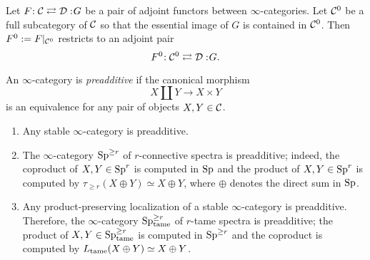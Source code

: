 
\begin{proposition}
\label{Restrict adjoints to full subcategory}
	Let $F\negmedspace: {\mathcal{C}}\rightleftarrows {\mathcal{D}}:\negmedspace G$ be a pair of adjoint functors between $\infty$-categories.
	Let ${\mathcal{C}}^0$ be a full subcategory of ${\mathcal{C}}$ so that the essential image of $G$ is contained in ${\mathcal{C}}^0$. Then $F^0:=F|_{{\mathcal{C}}^0}$ restricts to an adjoint pair 
	$$
	F^0\negmedspace: {\mathcal{C}}^0\rightleftarrows {\mathcal{D}}:\negmedspace G.
	$$
\end{proposition}

\begin{definition}
\cite[Definition 2.1]{Gepner-Moritz-Nikolaus}
\label{preadditive}
    An $\infty$-category is \emph{preadditive} if the canonical morphism 
    $$
    X\coprod Y \to X\times Y
    $$
    is an equivalence for any pair of objects $X,Y \in {\mathcal{C}}$.
\end{definition}

\begin{example}
\begin{enumerate}
    \item Any stable $\infty$-category is preadditive.
    \item The $\infty$-category $\operatorname{Sp}^{\geq r}$ of $r$-connective spectra is preadditive;
    indeed, the coproduct of $X,Y\in \operatorname{Sp}^{r}$ is computed in $\operatorname{Sp}$ and the product of $X,Y\in \operatorname{Sp}^{r}$ is computed by $\tau_{\geq r} (X\oplus Y)\simeq X\oplus Y$, where $\oplus$ denotes the direct sum in $\operatorname{Sp}$.
    \item Any product-preserving localization of a stable $\infty$-category is preadditive.
    Therefore, 
    the $\infty$-category $\operatorname{Sp}^{\geq r}_{\operatorname{\operatorname{tame}}}$ of $r$-tame spectra is preadditive; the product of $X,Y\in \operatorname{Sp}^{\geq r}_{\operatorname{\operatorname{tame}}}$ is computed in $\operatorname{Sp}^{\geq r}$ and the coproduct is computed by $L_{\operatorname{\operatorname{tame}}}(X\oplus Y) \simeq X\oplus Y$.
\end{enumerate}

\end{example}


